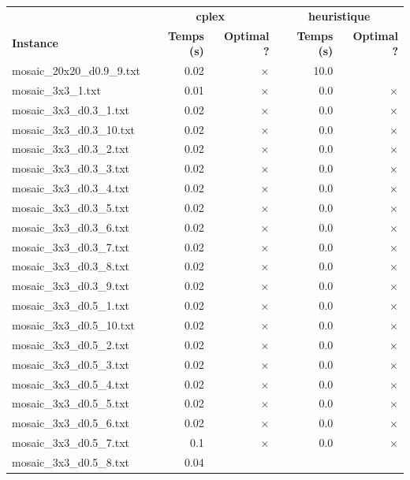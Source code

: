 \documentclass{article}
\begin{document}
\newpage
\begin{center}
\renewcommand{\arraystretch}{1.4} 
 \begin{tabular}{lrrrr}
	\hline
 & \multicolumn{2}{c}{\textbf{cplex}} & \multicolumn{2}{c}{\textbf{heuristique}}\\
\textbf{Instance}  & \textbf{Temps (s)} & \textbf{Optimal ?}  & \textbf{Temps (s)} & \textbf{Optimal ?} \\\hline

mosaic\_20x20\_d0.9\_9.txt & 0.02 & 
$\times$
 & 10.0 & 
\\
mosaic\_3x3\_1.txt & 0.01 & 
$\times$
 & 0.0 & 
$\times$
\\
mosaic\_3x3\_d0.3\_1.txt & 0.02 & 
$\times$
 & 0.0 & 
$\times$
\\
mosaic\_3x3\_d0.3\_10.txt & 0.02 & 
$\times$
 & 0.0 & 
$\times$
\\
mosaic\_3x3\_d0.3\_2.txt & 0.02 & 
$\times$
 & 0.0 & 
$\times$
\\
mosaic\_3x3\_d0.3\_3.txt & 0.02 & 
$\times$
 & 0.0 & 
$\times$
\\
mosaic\_3x3\_d0.3\_4.txt & 0.02 & 
$\times$
 & 0.0 & 
$\times$
\\
mosaic\_3x3\_d0.3\_5.txt & 0.02 & 
$\times$
 & 0.0 & 
$\times$
\\
mosaic\_3x3\_d0.3\_6.txt & 0.02 & 
$\times$
 & 0.0 & 
$\times$
\\
mosaic\_3x3\_d0.3\_7.txt & 0.02 & 
$\times$
 & 0.0 & 
$\times$
\\
mosaic\_3x3\_d0.3\_8.txt & 0.02 & 
$\times$
 & 0.0 & 
$\times$
\\
mosaic\_3x3\_d0.3\_9.txt & 0.02 & 
$\times$
 & 0.0 & 
$\times$
\\
mosaic\_3x3\_d0.5\_1.txt & 0.02 & 
$\times$
 & 0.0 & 
$\times$
\\
mosaic\_3x3\_d0.5\_10.txt & 0.02 & 
$\times$
 & 0.0 & 
$\times$
\\
mosaic\_3x3\_d0.5\_2.txt & 0.02 & 
$\times$
 & 0.0 & 
$\times$
\\
mosaic\_3x3\_d0.5\_3.txt & 0.02 & 
$\times$
 & 0.0 & 
$\times$
\\
mosaic\_3x3\_d0.5\_4.txt & 0.02 & 
$\times$
 & 0.0 & 
$\times$
\\
mosaic\_3x3\_d0.5\_5.txt & 0.02 & 
$\times$
 & 0.0 & 
$\times$
\\
mosaic\_3x3\_d0.5\_6.txt & 0.02 & 
$\times$
 & 0.0 & 
$\times$
\\
mosaic\_3x3\_d0.5\_7.txt & 0.1 & 
$\times$
 & 0.0 & 
$\times$
\\
mosaic\_3x3\_d0.5\_8.txt & 0.04 & 

\end{tabular}
\end{center}
\end{document}
